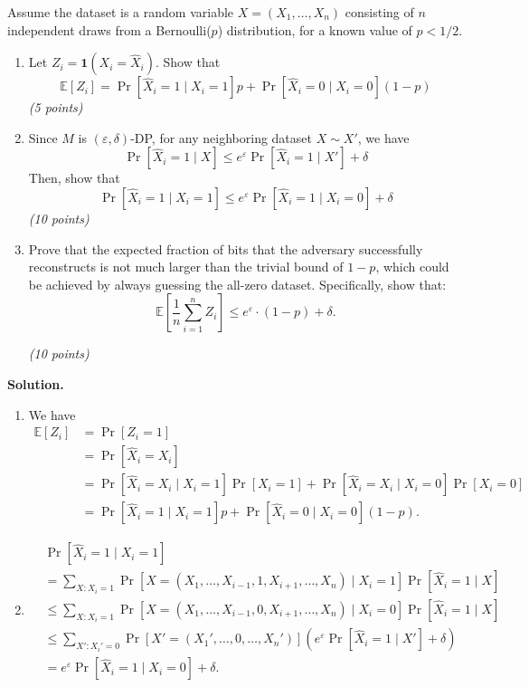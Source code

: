 \documentclass[12pt]{article}
\begin{document}
\begin{enumerate}
Assume the dataset is a random variable $X = (X_1, \dots, X_n)$ consisting of $n$ independent draws from a Bernoulli($p$) distribution, for a known value of $p < 1/2$.

\begin{enumerate}
    \item[(a)] Let $Z_i = \mathbf{1}(X_i = \hat{X}_i)$. Show that
    \[
    \mathbb{E}[Z_i] = \Pr[\hat{X}_i = 1 \mid X_i = 1]p + \Pr[\hat{X}_i = 0 \mid X_i = 0](1 - p)
    \]
    \textit{(5 points)}

    \item[(b)] Since $M$ is $(\varepsilon, \delta)$-DP, for any neighboring dataset $X \sim X'$, we have
    \[
    \Pr[\hat{X}_i = 1 \mid X] \leq e^{\varepsilon} \Pr[\hat{X}_i = 1 \mid X'] + \delta
    \]
    Then, show that
    \[
    \Pr[\hat{X}_i = 1 \mid X_i = 1] \leq e^{\varepsilon} \Pr[\hat{X}_i = 1 \mid X_i = 0] + \delta
    \]
    \textit{(10 points)}

    \item[(c)] Prove that the expected fraction of bits that the adversary successfully reconstructs is not much larger than the trivial bound of $1 - p$, which could be achieved by always guessing the all-zero dataset. Specifically, show that:
    \[
    \mathbb{E} \left[ \frac{1}{n} \sum_{i=1}^n Z_i \right] \leq e^{\varepsilon} \cdot (1 - p) + \delta.
    \]
    
    \textit{(10 points)}
    
\end{enumerate}


\begin{solution}
\textbf{Solution.}\\
\begin{enumerate}
\item[(a)] We have
\begin{align*}
\mathbb{E}[Z_i] &= \Pr[Z_i = 1] \\
&= \Pr[\hat{X}_i = X_i] \\
&= \Pr[\hat{X}_i = X_i \mid X_i = 1] \Pr[X_i = 1] + \Pr[\hat{X}_i = X_i \mid X_i = 0] \Pr[X_i = 0] \\
&= \Pr[\hat{X}_i = 1 \mid X_i = 1]p + \Pr[\hat{X}_i = 0 \mid X_i = 0](1 - p).
\end{align*}

\item[(b)] 
\begin{align*}
& \Pr[\hat{X}_i = 1 \mid X_i = 1] \\
&= \sum_{X : X_i = 1} \Pr[X = (X_1, \dots, X_{i-1}, 1, X_{i+1}, \dots, X_n) \mid X_i = 1] \Pr[\hat{X}_i = 1 \mid X] \\
&\leq \sum_{X : X_i = 1} \Pr[X = (X_1, \dots, X_{i-1}, 0, X_{i+1}, \dots, X_n) \mid X_i = 0] \Pr[\hat{X}_i = 1 \mid X] \\
&\leq \sum_{X' : X_i' = 0} \Pr[X' = (X_1', \dots, 0, \dots, X_n')] (e^{\varepsilon} \Pr[\hat{X}_i = 1 \mid X'] + \delta) \\
&= e^{\varepsilon} \Pr[\hat{X}_i = 1 \mid X_i = 0] + \delta.
\end{align*}


\end{enumerate}
\end{solution}
\end{enumerate}
\end{document}
